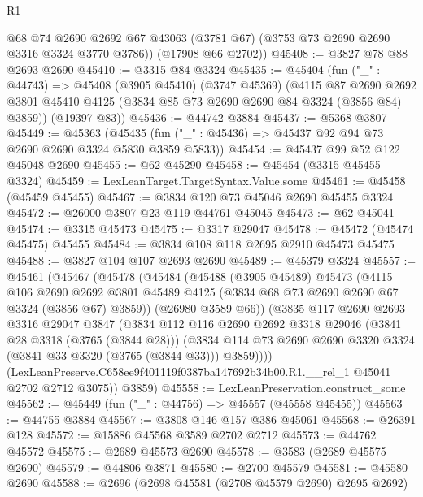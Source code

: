 \begin{lexlean}{R1}
\begin{coremodule}
        @68
        @74
        @2690
        @2692
        @67
        @43063
        (@3781 @67)
        (@3753 @73 @2690 @2690 @3316 @3324 @3770 @3786))
      (@17908 @66 @2702))
@45408 := @3827 @78 @88 @2693 @2690
@45410 := @3315 @84 @3324
@45435 := @45404
    (fun ("_" : @44743) =>
    @45408
      (@3905 @45410)
      (@3747 @45369)
      (@4115
        @87
        @2690
        @2692
        @3801
        @45410
        @4125
        (@3834 @85 @73 @2690 @2690 @84 @3324 (@3856 @84) @3859))
      (@19397 @83))
@45436 := @44742 @3884
@45437 := @5368 @3807
@45449 := @45363
    (@45435 (fun ("_" : @45436) => @45437 @92 @94 @73 @2690 @2690 @3324 @5830 @3859 @5833))
@45454 := @45437 @99 @52 @122 @45048 @2690
@45455 := @62 @45290
@45458 := @45454 (@3315 @45455 @3324)
@45459 := LexLeanTarget.TargetSyntax.Value.some
@45461 := @45458 (@45459 @45455)
@45467 := @3834 @120 @73 @45046 @2690 @45455 @3324
@45472 := @26000 @3807 @23 @119 @44761 @45045
@45473 := @62 @45041
@45474 := @3315 @45473
@45475 := @3317 @29047
@45478 := @45472 (@45474 @45475) @45455
@45484 := @3834 @108 @118 @2695 @2910 @45473 @45475
@45488 := @3827 @104 @107 @2693 @2690
@45489 := @45379 @3324
@45557 := @45461
    (@45467
      (@45478
        (@45484
          (@45488
            (@3905 @45489)
            @45473
            (@4115
              @106
              @2690
              @2692
              @3801
              @45489
              @4125
              (@3834 @68 @73 @2690 @2690 @67 @3324 (@3856 @67) @3859))
            (@26980 @3589 @66))
          (@3835
            @117
            @2690
            @2693
            @3316
            @29047
            @3847
            (@3834
              @112
              @116
              @2690
              @2692
              @3318
              @29046
              (@3841 @28 @3318 (@3765 (@3844 @28)))
              (@3834
                @114
                @73
                @2690
                @2690
                @3320
                @3324
                (@3841 @33 @3320 (@3765 (@3844 @33)))
                @3859))))
        (LexLeanPreserve.C658ee9f401119f0387ba147692b34b00.R1.__rel_1 @45041 @2702 @2712 @3075))
      @3859)
@45558 := LexLeanPreservation.construct_some
@45562 := @45449 (fun ("_" : @44756) => @45557 (@45558 @45455))
@45563 := @44755 @3884
@45567 := @3808 @146 @157 @386 @45061
@45568 := @26391 @128
@45572 := @15886 @45568 @3589 @2702 @2712
@45573 := @44762 @45572
@45575 := @2689 @45573 @2690
@45578 := @3583 (@2689 @45575 @2690)
@45579 := @44806 @3871
@45580 := @2700 @45579
@45581 := @45580 @2690
@45588 := @2696 (@2698 @45581 (@2708 @45579 @2690) @2695 @2692)

\end{coremodule}
\end{lexlean}
